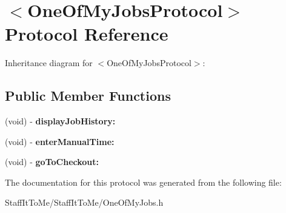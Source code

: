 \hypertarget{protocol_one_of_my_jobs_protocol-p}{
\section{$<$\-One\-Of\-My\-Jobs\-Protocol$>$ \-Protocol \-Reference}
\label{protocol_one_of_my_jobs_protocol-p}
}


\-Inheritance diagram for $<$\-One\-Of\-My\-Jobs\-Protocol$>$\-:
\subsection*{\-Public \-Member \-Functions}
\begin{DoxyCompactItemize}
\item 
\hypertarget{protocol_one_of_my_jobs_protocol-p_a880313b2533233e077e1b0191eae56ea}{
(void) -\/ {\bfseries display\-Job\-History\-:}}
\label{protocol_one_of_my_jobs_protocol-p_a880313b2533233e077e1b0191eae56ea}

\item 
\hypertarget{protocol_one_of_my_jobs_protocol-p_a7d29c23d79cb65f9efd1db29f0950316}{
(void) -\/ {\bfseries enter\-Manual\-Time\-:}}
\label{protocol_one_of_my_jobs_protocol-p_a7d29c23d79cb65f9efd1db29f0950316}

\item 
\hypertarget{protocol_one_of_my_jobs_protocol-p_a60e8d8100fe48dd726dde673a21cb8d8}{
(void) -\/ {\bfseries go\-To\-Checkout\-:}}
\label{protocol_one_of_my_jobs_protocol-p_a60e8d8100fe48dd726dde673a21cb8d8}

\end{DoxyCompactItemize}


\-The documentation for this protocol was generated from the following file\-:\begin{DoxyCompactItemize}
\item 
\-Staff\-It\-To\-Me/\-Staff\-It\-To\-Me/\-One\-Of\-My\-Jobs.\-h\end{DoxyCompactItemize}
